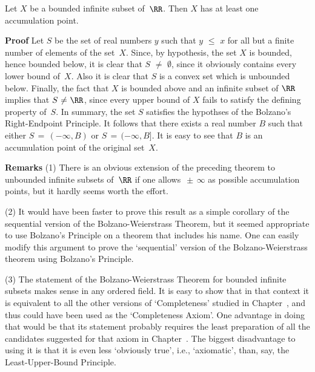 \V

        Let $X$ be a bounded infinite subset of~${\RR}$. Then $X$ has at least one accumulation point.

\V

        {\bf Proof} Let $S$ be the set of real numbers $y$ such that $y\,\,{\leq}\,\,x$ for all but a finite number of elements of the set~$X$.
    Since, by hypothesis, the set $X$ is bounded, hence bounded below, it is clear that
    $S \,\,{\neq}\,\, {\emptyset}$, since it obviously contains every lower bound of~$X$.
    Also it is clear that $S$ is a convex set which is unbounded below. Finally, the fact that $X$ is bounded above and an infinite subset of ${\RR}$
    implies that $S \,\,{\neq}\,\, {\RR}$, since every upper bound of $X$ fails to satisfy the defining property of~$S$.
    In summary, the set $S$ satisfies the hypothses of the Bolzano's Right-Endpoint Principle.
    It follows that there exists a real number $B$ such that either $S \,=\, (-{\infty},B)$ or $S \,=\, (-{\infty},B]$.
    It is easy to see that $B$ is an accumulation point of the original set~$X$.

\V

        {\bf Remarks} (1) There is an obvious extension of the preceding theorem to unbounded infinite subsets of~${\RR}$
    if one allows $ \,{\pm}\, {\infty}$ as possible accumulation points, but it hardly seems worth the effort.

\V

        (2) It would have been faster to prove this result as a simple corollary of the sequential version of the Bolzano-Weierstrass Theorem,
    but it seemed appropriate to use Bolzano's Principle on a theorem that includes his name.
    One can easily modify this argument to prove the `sequential' version of the Bolzano-Weierstrass theorem using Bolzano's Principle.


\V

        (3) The statement of the Bolzano-Weierstrass Theorem for bounded infinite subsets makes sense in any ordered field.
    It is easy to show that in that context it is equivalent to all the other versions of `Completeness' studied in Chapter~,
    and thus could have been used as the `Completeness Axiom'. One advantage in doing that would be
    that its statement probably requires the least preparation of all the candidates suggested for that axiom in Chapter~.
    The biggest disadvantage to using it is that it is even less `obviously true', i.e., `axiomatic', than, say, the Least-Upper-Bound Principle.

